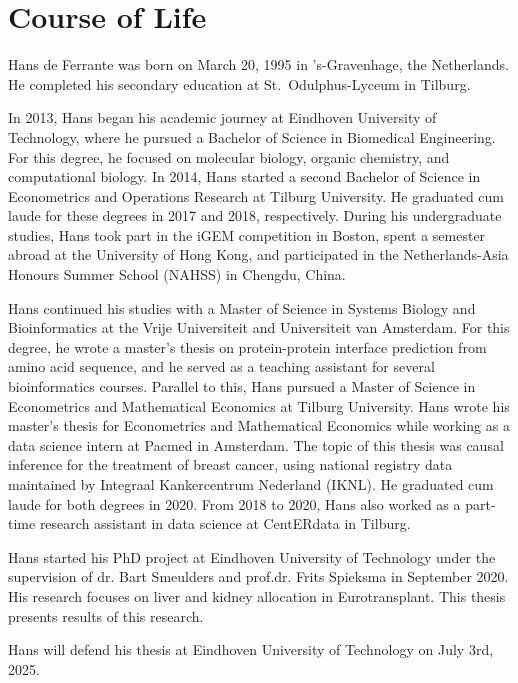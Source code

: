 \documentclass[11pt,twoside,]{book}
\begin{document}
\chapter*{Course of Life}\label{course-of-life}


Hans de Ferrante was born on March 20, 1995 in 's-Gravenhage, the Netherlands. He completed his secondary education at St.~Odulphus-Lyceum in Tilburg.

In 2013, Hans began his academic journey at Eindhoven University of Technology, where he pursued a Bachelor of Science in Biomedical Engineering. For this degree, he focused on molecular biology, organic chemistry, and computational biology. In 2014, Hans started a second Bachelor of Science in Econometrics and Operations Research at Tilburg University. He graduated cum laude for these degrees in 2017 and 2018, respectively. During his undergraduate studies, Hans took part in the iGEM competition in Boston, spent a semester abroad at the University of Hong Kong, and participated in the Netherlands-Asia Honours Summer School (NAHSS) in Chengdu, China.

Hans continued his studies with a Master of Science in Systems Biology and Bioinformatics at the Vrije Universiteit and Universiteit van Amsterdam. For this degree, he wrote a master's thesis on protein-protein interface prediction from amino acid sequence, and he served as a teaching assistant for several bioinformatics courses. Parallel to this, Hans pursued a Master of Science in Econometrics and Mathematical Economics at Tilburg University. Hans wrote his master's thesis for Econometrics and Mathematical Economics while working as a data science intern at Pacmed in Amsterdam. The topic of this thesis was causal inference for the treatment of breast cancer, using national registry data maintained by Integraal Kankercentrum Nederland (IKNL). He graduated cum laude for both degrees in 2020. From 2018 to 2020, Hans also worked as a part-time research assistant in data science at CentERdata in Tilburg.

Hans started his PhD project at Eindhoven University of Technology under the
supervision of dr. Bart Smeulders and prof.dr. Frits Spieksma in September 2020.
His research focuses on liver and kidney allocation in Eurotransplant. This
thesis presents results of this research.

Hans will defend his thesis at Eindhoven University of Technology on July 3rd, 2025.
\end{document}

